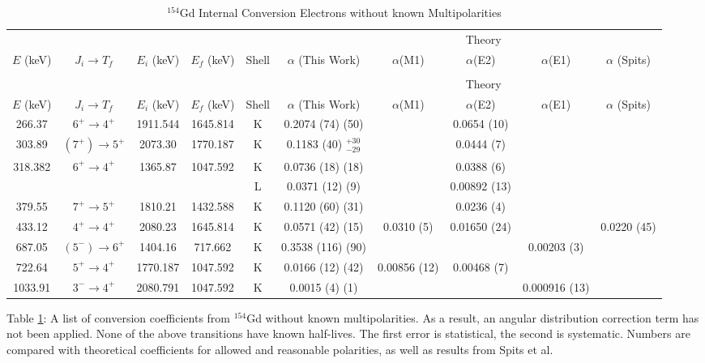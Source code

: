 \begin{sidewaystable}
\small
    \begin{longtable}{c|c|c|c|c|c|c|c|c|c}
        \caption{$^{154}$Gd Internal Conversion Electrons without known Multipolarities}
        \label{tab:154Gd_No_Mult_ICC}\\
        \toprule
        &	& 	&  &	& & \multicolumn{3}{c|}{Theory}	& 	\\ 
        $E$ (keV)	& $J_i\rightarrow T_f$ & $E_i$ (keV)	&	$E_f$ (keV)	& Shell & 		$\alpha$ (This Work)	& $\alpha$(M1) & $\alpha$(E2) & $\alpha$(E1) &	$\alpha$ (Spits)	\\
        \hline
        \endfirsthead
        \toprule
        \caption[]{$^{154}$Gd Internal Conversion Electrons without known Multipolarities}\\
        &	& 	&  &	& & \multicolumn{3}{c|}{Theory}	& 	\\ 
        $E$ (keV)	& $J_i\rightarrow T_f$ & $E_i$ (keV)	&	$E_f$ (keV)	& Shell &		$\alpha$ (This Work)	& $\alpha$(M1) & $\alpha$(E2) & $\alpha$(E1) &	$\alpha$ (Spits)	\\
	    \endhead
	    \hline
	    266.37	&	$6^+	\rightarrow	4^+$	&	1911.544	&	1645.814		& K &	0.2074	(74) (50) &  & 0.0654 (10) & & \\ \hline
	    303.89	&	$(7^+)	\rightarrow	5^+$	&	2073.30	&	1770.187	& K &	0.1183	(40) $^{+30}_{-29}$  & & 0.0444 (7) & & \\ \hline
	    318.382	&	$6^+	\rightarrow	4^+$	&	1365.87	&	1047.592	& K &	0.0736	(18) (18)  & & 0.0388 (6) & &\\
	    &		&		&		& L & 	0.0371	(12) (9) &	& 0.00892 (13) & &	\\  \hline
	    379.55	&	$7^+	\rightarrow	5^+$	&	1810.21	&	1432.588	& K & 	0.1120	(60) (31) &  & 0.0236 (4) & & \\ \hline
        433.12	&	$4^+	\rightarrow	4^+$	&	2080.23	&	1645.814	& K &	0.0571	(42) (15) & 0.0310 (5) & 0.01650 (24) &	& 0.0220 (45)\\ \hline
        687.05	&	$(5^-) \rightarrow 6^+$		&	1404.16	&	717.662 & K & 0.3538	(116) (90)	& & & 0.00203 (3) &\\ \hline
        722.64	&	$5^+	\rightarrow	4^+$	&	1770.187	&	1047.592 & K		&	0.0166	(12) (42)	& 0.00856 (12) & 0.00468 (7) & &		\\ \hline
        1033.91	&	$3^-	\rightarrow	4^+$	&	2080.791	&	1047.592 & K	&	0.0015	(4) (1)	& & & 0.000916 (13) &	\\
        \bottomrule
	\end{longtable}
    \item{Table \ref{tab:154Gd_No_Mult_ICC}: A list of conversion coefficients from $^{154}$Gd without known multipolarities. As a result, an angular distribution correction term has not been applied. None of the above transitions have known half-lives. The first error is statistical, the second is systematic. Numbers are compared with theoretical coefficients for allowed and reasonable polarities, as well as results from Spits et al. \cite{spits96:_154gd}}
\end{sidewaystable}